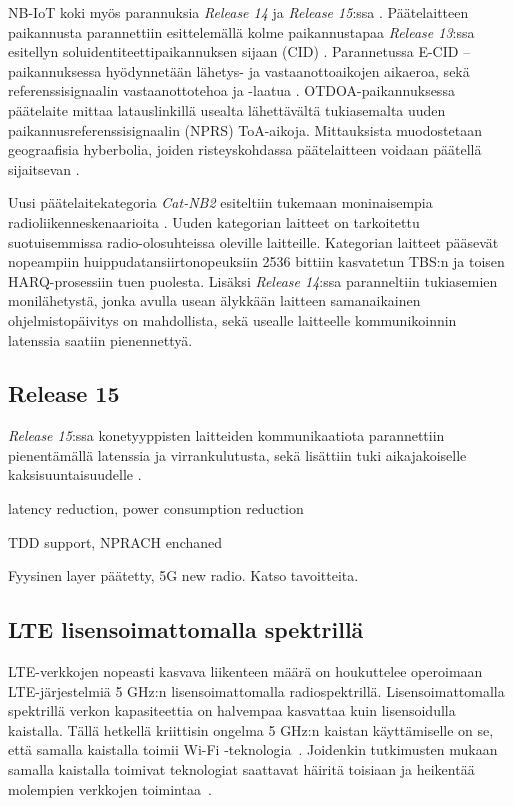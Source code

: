 \documentclass[finnish,12pt,a4paper,pdftex]{article}
\begin{document}
NB-IoT koki myös parannuksia \textit{Release 14} ja \textit{Release 15}:ssa \cite{release15}. Päätelaitteen paikannusta parannettiin esittelemällä kolme paikannustapaa \textit{Release 13}:ssa esitellyn soluidentiteettipaikannuksen sijaan (CID) \cite{ratasuk2017enhancements}. Parannetussa E-CID --paikannuksessa hyödynnetään lähetys- ja vastaanottoaikojen aikaeroa, sekä referenssisignaalin vastaanottotehoa ja -laatua \cite{hoglund2017overview}. OTDOA-paikannuksessa päätelaite mittaa latauslinkillä usealta lähettävältä tukiasemalta uuden paikannusreferenssisignaalin (NPRS) ToA-aikoja. Mittauksista muodostetaan geograafisia hyberbolia, joiden risteyskohdassa päätelaitteen voidaan päätellä sijaitsevan \cite{hoglund2017overview}.

Uusi päätelaitekategoria \textit{Cat-NB2} esiteltiin tukemaan moninaisempia radioliikenneskenaarioita \cite{hoglund2017overview}. Uuden kategorian laitteet on tarkoitettu suotuisemmissa radio-olosuhteissa oleville laitteille. Kategorian laitteet pääsevät nopeampiin huippudatansiirtonopeuksiin 2536 bittiin kasvatetun TBS:n ja toisen HARQ-prosessiin tuen puolesta. Lisäksi \textit{Release 14}:ssa paranneltiin tukiasemien monilähetystä, jonka avulla usean älykkään laitteen samanaikainen ohjelmistopäivitys on mahdollista, sekä usealle laitteelle kommunikoinnin latenssia saatiin pienennettyä.

\subsection{Release 15}

\textit{Release 15}:ssa konetyyppisten laitteiden kommunikaatiota parannettiin pienentämällä latenssia ja virrankulutusta, sekä lisättiin tuki aikajakoiselle kaksisuuntaisuudelle \cite{ratasuk2017enhancements}. 

latency reduction, power consumption reduction

TDD support, NPRACH enchaned

Fyysinen layer päätetty, 5G new radio. Katso tavoitteita.

\subsection{LTE lisensoimattomalla spektrillä}

LTE-verkkojen nopeasti kasvava liikenteen määrä on houkuttelee operoimaan LTE-järjestelmiä 5 GHz:n lisensoimattomalla radiospektrillä. Lisensoimattomalla spektrillä verkon kapasiteettia on halvempaa kasvattaa kuin lisensoidulla kaistalla. Tällä hetkellä kriittisin ongelma 5 GHz:n kaistan käyttämiselle on se, että samalla kaistalla toimii Wi-Fi -teknologia~\cite{ismaiel2017survey}. Joidenkin tutkimusten mukaan samalla kaistalla toimivat teknologiat saattavat häiritä toisiaan ja heikentää molempien verkkojen toimintaa~\cite{naik2018coexistence, ismaiel2017survey}.
\end{document}
